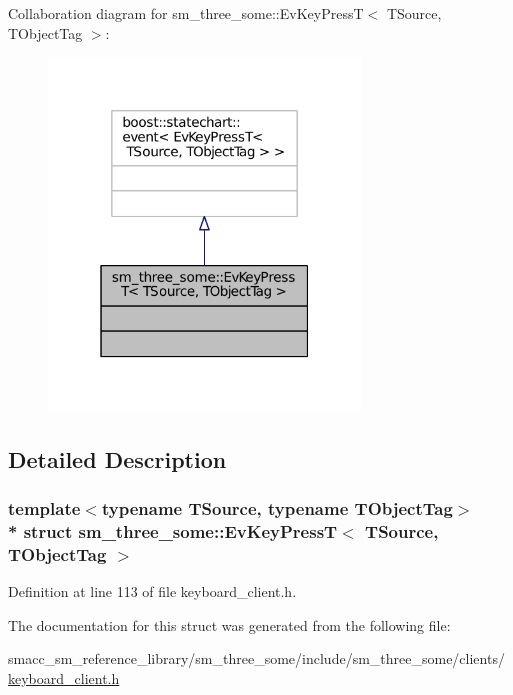 Collaboration diagram for sm\+\_\+three\+\_\+some\+:\+:Ev\+Key\+PressT$<$ T\+Source, T\+Object\+Tag $>$\+:
\nopagebreak
\begin{figure}[H]
\begin{center}
\leavevmode
\includegraphics[width=235pt]{structsm__three__some_1_1EvKeyPressT__coll__graph}
\end{center}
\end{figure}


\subsection{Detailed Description}
\subsubsection*{template$<$typename T\+Source, typename T\+Object\+Tag$>$\\*
struct sm\+\_\+three\+\_\+some\+::\+Ev\+Key\+Press\+T$<$ T\+Source, T\+Object\+Tag $>$}



Definition at line 113 of file keyboard\+\_\+client.\+h.



The documentation for this struct was generated from the following file\+:\begin{DoxyCompactItemize}
\item 
smacc\+\_\+sm\+\_\+reference\+\_\+library/sm\+\_\+three\+\_\+some/include/sm\+\_\+three\+\_\+some/clients/\hyperlink{keyboard__client_8h}{keyboard\+\_\+client.\+h}\end{DoxyCompactItemize}
